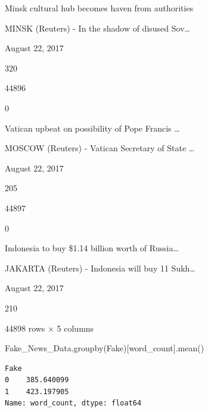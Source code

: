 \documentclass[
  11pt,
  a4paper,
]{article}
\newenvironment{Shaded}{\begin{snugshade}}{\end{snugshade}}
\newcommand{\NormalTok}[1]{#1}
\newcommand{\StringTok}[1]{\textcolor[rgb]{0.31,0.60,0.02}{#1}}
\begin{document}
Minsk cultural hub becomes haven from authorities

MINSK (Reuters) - In the shadow of disused Sov\ldots{}

August 22, 2017

320

44896

0

Vatican upbeat on possibility of Pope Francis \ldots{}

MOSCOW (Reuters) - Vatican Secretary of State \ldots{}

August 22, 2017

205

44897

0

Indonesia to buy \$1.14 billion worth of Russia\ldots{}

JAKARTA (Reuters) - Indonesia will buy 11 Sukh\ldots{}

August 22, 2017

210

44898 rows × 5 columns

\begin{Shaded}
\begin{Highlighting}[]
\NormalTok{Fake\_News\_Data.groupby(}\StringTok{\textquotesingle{}Fake\textquotesingle{}}\NormalTok{)[}\StringTok{\textquotesingle{}word\_count\textquotesingle{}}\NormalTok{].mean()}
\end{Highlighting}
\end{Shaded}

\begin{verbatim}
Fake
0    385.640099
1    423.197905
Name: word_count, dtype: float64
\end{verbatim}
\end{document}
